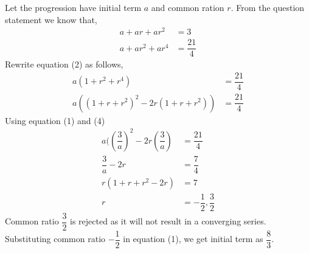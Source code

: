 \begin{solution}
  Let the progression have initial term $a$ and common ration $r$. From the question statement we know that,
  \begin{align}
    a+ar+ar^2   &= 3 \\
    a+ar^2+ar^4 &= \dfrac{21}{4}
  \end{align}
  Rewrite equation (2) as follows,
  \begin{align}
    a(1+r^2+r^4)               &= \dfrac{21}{4} \\
	a((1+r+r^2)^2-2r(1+r+r^2)) &= \dfrac{21}{4}
  \end{align}
  Using equation (1) and (4)
  \begin{align}
    a((\dfrac{3}{a})^2-2r(\dfrac{3}{a}) &= \dfrac{21}{4} \\
    \dfrac{3}{a}-2r                     &= \dfrac{7}{4} \\
    r(1+r+r^2-2r)                       &= 7 \\
    r                                   &= -\dfrac{1}{2},\dfrac{3}{2}
  \end{align}
  Common ratio $\dfrac{3}{2}$ is rejected as it will not result in a converging series. Substituting common ratio $-\dfrac{1}{2}$ in equation (1), we get initial term as $\dfrac{8}{3}$.

\end{solution}
